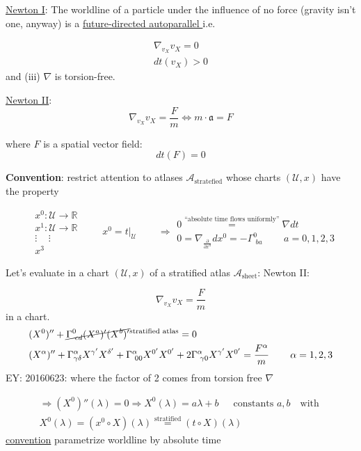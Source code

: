\documentclass[10pt]{amsart}
\begin{document}
\begin{multicols*}{2}
	\underline{Newton I}: The worldline of a particle under the influence of no force (gravity isn't one, anyway) is a \underline{future-directed autoparallel } i.e.
	
	\[
	\begin{gathered}
	\nabla_{v_{X}} v_{X} = 0 \\
	dt(v_{X}) > 0 
	\end{gathered}
	\]
	and
	(iii) $\nabla$ is torsion-free.
	
	\underline{Newton II}: 
	\[
	\nabla_{v_{X}} v_X = \frac{F}{m} \Longleftrightarrow m \cdot \mathfrak{a} = F
	\]
	
	
	where $F$ is a spatial vector field:
	\[
	dt(F) = 0 
	\]
	
	\textbf{Convention}: restrict attention to atlases $\mathcal{A}_{\text{stratefied}}$ whose charts $(\mathcal{U}, x)$ have the property
	
	\[
	\begin{aligned}
	& x^0:\mathcal{U} \to \mathbb{R} \\ 
	& x^1: \mathcal{U} \to \mathbb{R} \\ 
	& \vdots \quad \, \vdots \\ 
	& x^3
	\end{aligned}
	\quad \quad \, 
	x^0 = \left. t \right|_{\mathcal{U}}  \quad\quad \, \Longrightarrow \begin{gathered} 0 \overset{\text{``absolute time flows uniformly''} }{=} \nabla dt \\
	0 = \nabla_{\frac{ \partial }{ \partial x^a} } dx^0 = - \Gamma_{ \, \, ba }^0 \quad \quad \, a = 0,1,2,3
	\end{gathered}
	\]
	
	Let's evaluate in a chart $(\mathcal{U},x)$ of a stratified atlas $\mathcal{A}_{\text{sheet}}$: Newton II:
	
	\[
	\nabla_{v_X} v_X = \frac{F}{m}
	\]
	in a chart.
	\[
	\begin{aligned}
	& (X^0)'' + \cancel{ \Gamma^0_{ \, \, cd } (X^a)' (X^b)' }^{ \text{stratified atlas}} = 0  \\
	& (X^{\alpha})'' + \Gamma^{\alpha}_{\gamma \delta} X^{\gamma'} X^{\delta'} + \Gamma^{\alpha}_{ \, \, 00} X^{0'} X^{0'} + 2\Gamma^{\alpha}_{ \, \, \gamma 0} X^{\gamma'} X^{0'} = \frac{F^{\alpha}}{m} \quad \quad \, \alpha = 1,2,3
	\end{aligned}
	\]
	EY: 20160623: where the factor of 2 comes from torsion free $\nabla$
	
	\[
	\begin{gathered}
	\Longrightarrow (X^0)''(\lambda) = 0 \Longrightarrow X^0(\lambda) = a\lambda + b \quad \, \text{ constants $a,b$ } \text{ with  }  \\
	X^0(\lambda) = (x^0 \circ X)(\lambda) \overset{\text{stratified}}{=} (t\circ X)(\lambda)
	\end{gathered}
	\]
	\underline{convention} parametrize worldline by absolute time
	

\end{multicols*}
\end{document}
